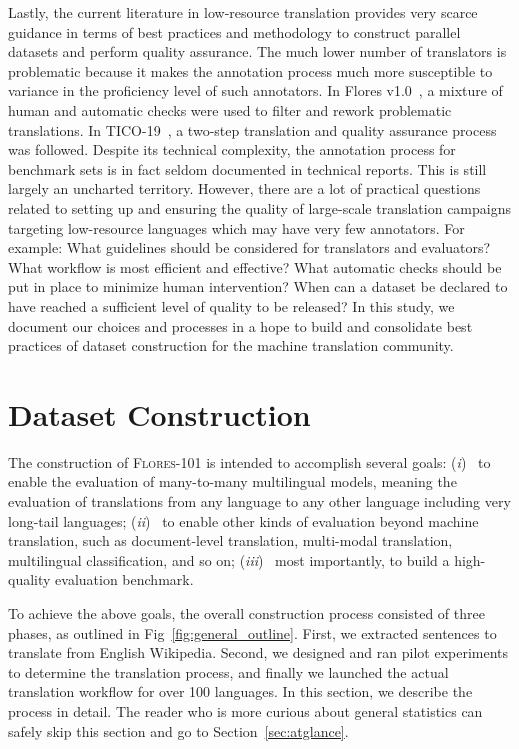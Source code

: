 Lastly, the current literature in low-resource translation provides very scarce guidance in terms of best practices and methodology to construct parallel datasets and perform quality assurance. The much lower number of translators is problematic because it makes the annotation process much more susceptible to variance in the proficiency level of such annotators. In Flores v1.0~\citep{guzman-etal-2019-flores}, a mixture of human and automatic checks were used to filter and rework problematic translations. In TICO-19~\cite{tico19}, a two-step translation and quality assurance process was followed. Despite its technical complexity, the annotation process for benchmark sets is in fact seldom documented in technical reports. This is still largely an uncharted territory. However, there are a lot of practical questions related to setting up and ensuring the quality of large-scale translation campaigns targeting low-resource languages which may have very few annotators. For example: What guidelines should be considered for translators and evaluators? What workflow is most efficient and effective? What automatic checks should be put in place to minimize human intervention? When can a dataset be declared to have reached a sufficient level of quality to be released? In this study, we document our choices and processes in a hope to build and consolidate best practices of dataset construction for the machine translation community. 

\section{Dataset Construction} 
\label{sec:construction}
The construction of \textsc{Flores-101} is intended to accomplish several goals: 
({\em i})~ to enable the evaluation of many-to-many multilingual models, meaning the evaluation of translations from any language to any other language including very long-tail languages;
({\em ii})~ to enable other kinds of evaluation beyond machine translation, such as document-level translation, multi-modal translation, multilingual classification, and so on; 
({\em iii})~ most importantly, to build a high-quality evaluation benchmark. 

To achieve the above goals, the overall construction process consisted of three phases, as outlined in Fig~\ref{fig:general_outline}. 
First, we extracted sentences to translate from English Wikipedia. Second, we designed and ran pilot experiments to determine the translation process, and finally we launched the actual translation workflow for over 100 languages. In this section, we describe the process in detail. The reader who is more curious about general statistics can safely skip this section and go to Section~\ref{sec:atglance}.

